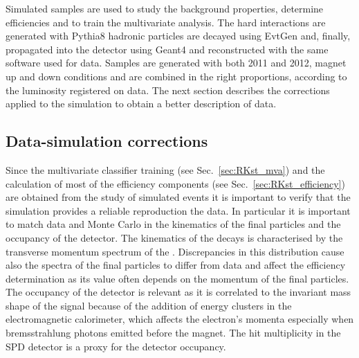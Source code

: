 Simulated samples are used to study the background properties, determine efficiencies and to train
the multivariate analysis. The hard interactions are generated with Pythia8 hadronic particles
are decayed using EvtGen and, finally, propagated into the detector using Geant4 and reconstructed
with the same software used for data. Samples are generated with both 2011 and 2012, magnet up and down
conditions and are combined in the right proportions, according to the luminosity registered on data.
The next section describes the corrections applied to the simulation to obtain a better description of data.


\subsection{Data-simulation corrections}
\label{sec:RKst_mc_weighting}

Since the multivariate classifier training (see Sec.~\ref{sec:RKst_mva}) and the calculation
of most of the efficiency components (see Sec.~\ref{sec:RKst_efficiency}) are obtained from
the study of simulated events it is important to verify that the simulation provides a reliable
reproduction the data. In particular it is important to match data and Monte Carlo
in the kinematics of the final particles and the occupancy of the detector.
The kinematics of the decays is characterised by the transverse momentum spectrum of
the \Bz. Discrepancies in this distribution cause also the spectra of the final particles
to differ from data and affect the efficiency determination as its value often
depends on the momentum of the final particles.
The occupancy of the detector is relevant as it is correlated to the invariant mass shape of the signal
because of the addition of energy clusters in the electromagnetic calorimeter,
which affects the electron's momenta especially when bremsstrahlung photons emitted before the magnet.
The hit multiplicity in the SPD detector is a proxy for the detector occupancy.

